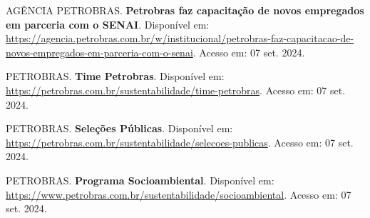 \noindent AGÊNCIA PETROBRAS. \textbf{Petrobras faz capacitação de novos empregados em parceria com o SENAI}. Disponível em: \url{https://agencia.petrobras.com.br/w/institucional/petrobras-faz-capacitacao-de-novos-empregados-em-parceria-com-o-senai}. Acesso em: 07 set. 2024.

\noindent PETROBRAS. \textbf{Time Petrobras}. Disponível em: \url{https://petrobras.com.br/sustentabilidade/time-petrobras}. Acesso em: 07 set. 2024.

\noindent PETROBRAS. \textbf{Seleções Públicas}. Disponível em: \url{https://petrobras.com.br/sustentabilidade/selecoes-publicas}. Acesso em: 07 set. 2024.

\noindent PETROBRAS. \textbf{Programa Socioambiental}. Disponível em: \url{https://www.petrobras.com.br/sustentabilidade/socioambiental}. Acesso em: 07 set. 2024.



